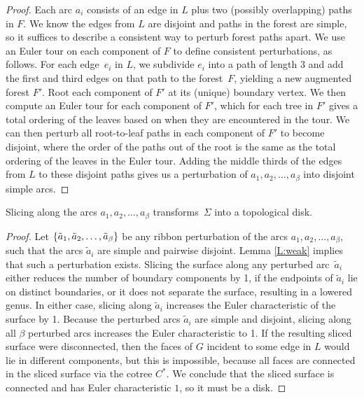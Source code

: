 \documentclass[letterpaper,review]{siamart190516}
\def\enote#1{\textcolor{magenta}{Erin: #1}}
\begin{document}
\begin{proof} 
Each arc $a_i$ consists of an edge in $L$ plus two (possibly overlapping) paths in $F$.  We know the edges from $L$ are disjoint and paths in the forest are simple, so it suffices to describe a consistent way to perturb forest paths apart.  
We use an Euler tour on each component of $F$ to define consistent perturbations, as follows.
For each edge~$e_i$ in $L$, we subdivide $e_i$ into a path of length $3$ and add the first and third edges on that path to the forest~$F$, yielding a new augmented forest $F'$.  Root each component of $F'$ at its (unique) boundary vertex.
We then compute an Euler tour for each component of $F'$, which for each tree in $F'$ gives a total ordering of the leaves based on when they are encountered in the tour.
We can then perturb all root-to-leaf paths in each component of $F'$ to become disjoint,  where the order of the paths out of the root is the same as the total ordering of the leaves in the Euler tour.
Adding the middle thirds of the edges from $L$ to these disjoint paths gives us a perturbation of $a_1, a_2, \dots, a_\beta$ into disjoint simple arcs.
\end{proof}

\begin{lemma}
\label{lem:disk}
Slicing along the arcs $a_1, a_2, \dots, a_\beta$ transforms~$\Sigma$ into a topological disk.
\end{lemma}

\begin{proof}
Let $\{ \tilde{a}_1, \tilde{a}_2, \dots, \tilde{a}_\beta \}$ be any ribbon perturbation of the arcs
$a_1, a_2, \dots, a_\beta$, such that the arcs $\tilde{a}_i$ are simple and pairwise disjoint.
Lemma \ref{L:weak} implies that such a perturbation exists.  Slicing the surface along any perturbed
arc~$\tilde{a}_i$ either reduces the number of boundary components by 1, if the endpoints of
$\tilde{a}_i$ lie on distinct boundaries, or it does not separate the surface, resulting in a
lowered genus.
In either case, slicing along $\tilde{a}_i$ increases the Euler characteristic of the surface by 1.  Because the perturbed arcs $\tilde{a}_i$ are simple and disjoint, slicing along all $\beta$ perturbed arcs increases the Euler characteristic to 1.  If the resulting sliced surface were disconnected, then the faces of $G$ incident to some edge in $L$ would lie in different components, but this is impossible, because all faces are connected in the sliced surface via the cotree $C^*$.  We conclude that the sliced surface is connected and has Euler characteristic $1$, so it must be a disk.  %
\end{proof}
\end{document}

